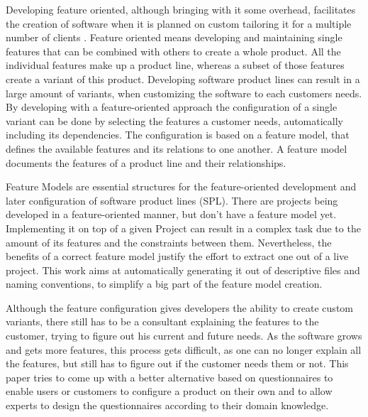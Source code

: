 % 
% 
% 
% 
Developing feature oriented, although bringing with it some overhead, facilitates the creation of software when it is planned on custom tailoring it for a multiple number of clients \cite{spl-pp}. Feature oriented means developing and maintaining single features that can be combined with others to create a whole product. All the individual features make up a product line, whereas a subset of those features create a variant of this product. Developing software product lines can result in a large amount of variants, when customizing the software to each customers needs. By developing with a feature-oriented approach the configuration of a single variant can be done by selecting the features a customer needs, automatically including its dependencies. The configuration is based on a feature model, that defines the available features and its relations to one another. A feature model documents the features of a product line and their relationships\cite{fospl}.

Feature Models are essential structures for the feature-oriented development and later configuration of software product lines (SPL). There are projects being developed in a feature-oriented manner, but don't have a feature model yet. Implementing it on top of a given Project can result in a complex task due to the amount of its features and the constraints between them. Nevertheless, the benefits of a correct feature model justify the effort to extract one out of a live project. This work aims at automatically generating it out of descriptive files and naming conventions, to simplify a big part of the feature model creation.

Although the feature configuration gives developers the ability to create custom variants, there still has to be a consultant explaining the features to the customer, trying to figure out his current and future needs. As the software grows and gets more features, this process gets difficult, as one can no longer explain all the features, but still has to figure out if the customer needs them or not. This paper tries to come up with a better alternative based on questionnaires to enable users or customers to configure a product on their own and to allow experts to design the questionnaires according to their domain knowledge.
 
